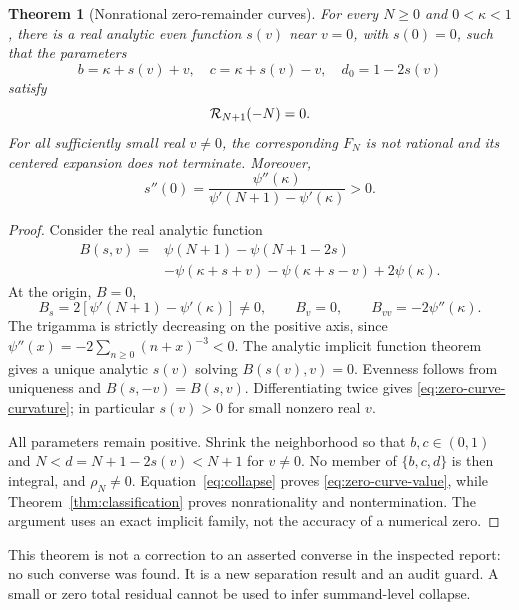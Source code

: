 \documentclass[11pt,a4paper]{article}
\numberwithin{equation}{section}
\newtheorem{theorem}{Theorem}[section]
\theoremstyle{definition}\newtheorem{definition}[theorem]{Definition}
\theoremstyle{remark}\newtheorem{remark}[theorem]{Remark}
\begin{document}
\begin{theorem}[Nonrational zero-remainder curves]
\label{thm:zero-curves}
For every $N\ge0$ and $0<\kappa<1$, there is a real analytic even
function $s(v)$ near $v=0$, with $s(0)=0$, such that the parameters
\begin{equation}
 b=\kappa+s(v)+v,\quad c=\kappa+s(v)-v,\quad
 d_0=1-2s(v)
 \label{eq:zero-curve}
\end{equation}
satisfy
\begin{equation}
 \mathcal R_{N+1}(-N)=0.
 \label{eq:zero-curve-value}
\end{equation}
For all sufficiently small real $v\ne0$, the corresponding $F_N$ is
not rational and its centered expansion does not terminate. Moreover,
\begin{equation}
 s''(0)=\frac{\psi''(\kappa)}{\psi'(N+1)-\psi'(\kappa)}>0.
 \label{eq:zero-curve-curvature}
\end{equation}
\end{theorem}
\begin{proof}
Consider the real analytic function
\begin{align*}
 B(s,v)={}&\psi(N+1)-\psi(N+1-2s)\\
          &-\psi(\kappa+s+v)-\psi(\kappa+s-v)+2\psi(\kappa).
\end{align*}
At the origin, $B=0$,
\[
 B_s=2[\psi'(N+1)-\psi'(\kappa)]\ne0,
 \qquad B_v=0,\qquad B_{vv}=-2\psi''(\kappa).
\]
The trigamma is strictly decreasing on the positive axis, since
$\psi''(x)=-2\sum_{n\ge0}(n+x)^{-3}<0$. The analytic implicit
function theorem gives a unique analytic $s(v)$ solving $B(s(v),v)=0$.
Evenness follows from uniqueness and $B(s,-v)=B(s,v)$.
Differentiating twice gives \eqref{eq:zero-curve-curvature}; in
particular $s(v)>0$ for small nonzero real $v$.

All parameters remain positive. Shrink the neighborhood so that
$b,c\in(0,1)$ and $N<d=N+1-2s(v)<N+1$ for $v\ne0$.
No member of $\{b,c,d\}$ is then integral, and $\rho_N\ne0$.
Equation~\eqref{eq:collapse} proves \eqref{eq:zero-curve-value},
while Theorem~\ref{thm:classification} proves nonrationality and
nontermination. The argument uses an exact implicit family, not the
accuracy of a numerical zero.
\end{proof}

This theorem is not a correction to an asserted converse in the inspected
report: no such converse was found. It is a new separation result and an
audit guard. A small or zero total residual cannot be used to infer
summand-level collapse.
\end{document}
